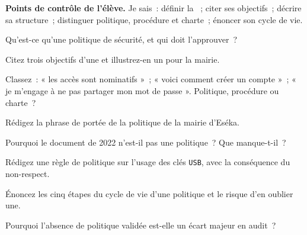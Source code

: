 \begin{boxinfo}
\textbf{Points de contrôle de l'élève.} Je sais~: définir la ~;
citer ses objectifs~; décrire sa structure~; distinguer politique, procédure et
charte~; énoncer son cycle de vie.
\end{boxinfo}

\bigskip

\begin{boxexo}[title={\ding{45}\quad Exercice~5.1. Définition \niveaubase}]
Qu'est-ce qu'une politique de sécurité, et qui doit l'approuver~?
\end{boxexo}

\begin{boxexo}[title={\ding{45}\quad Exercice~5.2. Objectifs \niveaubase}]
Citez trois objectifs d'une  et illustrez-en un pour la mairie.
\end{boxexo}

\begin{boxexo}[title={\ding{45}\quad Exercice~5.3. Trois niveaux \niveaubase}]
Classez~: « les accès sont nominatifs »~; « voici comment créer un compte »~;
« je m'engage à ne pas partager mon mot de passe ». Politique, procédure ou
charte~?
\end{boxexo}

\begin{boxexo}[title={\ding{45}\quad Exercice~5.4. Portée \niveaumoyen}]
Rédigez la phrase de portée de la politique de la mairie d'Eséka.
\end{boxexo}

\begin{boxexo}[title={\ding{45}\quad Exercice~5.5. Brouillon ou politique \niveaumoyen}]
Pourquoi le document de 2022 n'est-il pas une politique~? Que manque-t-il~?
\end{boxexo}

\begin{boxexo}[title={\ding{45}\quad Exercice~5.6. Une règle complète \niveaumoyen}]
Rédigez une règle de politique sur l'usage des clés \texttt{USB}, avec la
conséquence du non-respect.
\end{boxexo}

\begin{boxexo}[title={\ding{45}\quad Exercice~5.7. Cycle de vie \niveaumoyen}]
Énoncez les cinq étapes du cycle de vie d'une politique et le risque d'en
oublier une.
\end{boxexo}

\begin{boxexo}[title={\ding{45}\quad Exercice~5.8. Écart d'audit \niveaumoyen}]
Pourquoi l'absence de politique validée est-elle un écart majeur en audit~?
\end{boxexo}


